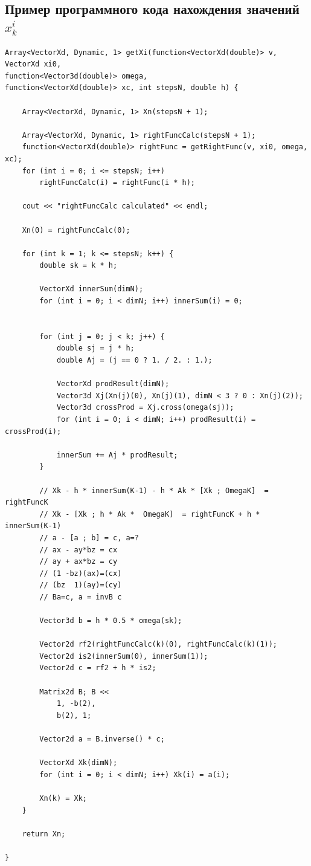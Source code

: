 \documentclass[12pt,a4paper]{article}
\begin{document}
\subsection{Пример программного кода нахождения значений $x_k^i$}
\label{code:xk}
\begin{lstlisting}
Array<VectorXd, Dynamic, 1> getXi(function<VectorXd(double)> v,
VectorXd xi0,
function<Vector3d(double)> omega,
function<VectorXd(double)> xc, int stepsN, double h) {

    Array<VectorXd, Dynamic, 1> Xn(stepsN + 1);

    Array<VectorXd, Dynamic, 1> rightFuncCalc(stepsN + 1);
    function<VectorXd(double)> rightFunc = getRightFunc(v, xi0, omega, xc);
    for (int i = 0; i <= stepsN; i++)
        rightFuncCalc(i) = rightFunc(i * h);

    cout << "rightFuncCalc calculated" << endl;

    Xn(0) = rightFuncCalc(0);

    for (int k = 1; k <= stepsN; k++) {
        double sk = k * h;

        VectorXd innerSum(dimN);
        for (int i = 0; i < dimN; i++) innerSum(i) = 0;


        for (int j = 0; j < k; j++) {
            double sj = j * h;
            double Aj = (j == 0 ? 1. / 2. : 1.);

            VectorXd prodResult(dimN);
            Vector3d Xj(Xn(j)(0), Xn(j)(1), dimN < 3 ? 0 : Xn(j)(2));
            Vector3d crossProd = Xj.cross(omega(sj));
            for (int i = 0; i < dimN; i++) prodResult(i) = crossProd(i);

            innerSum += Aj * prodResult;
        }

        // Xk - h * innerSum(K-1) - h * Ak * [Xk ; OmegaK]  = rightFuncK
        // Xk - [Xk ; h * Ak *  OmegaK]  = rightFuncK + h * innerSum(K-1)
        // a - [a ; b] = c, a=?
        // ax - ay*bz = cx
        // ay + ax*bz = cy
        // (1 -bz)(ax)=(cx)
        // (bz  1)(ay)=(cy)
        // Ba=c, a = invB c

        Vector3d b = h * 0.5 * omega(sk);

        Vector2d rf2(rightFuncCalc(k)(0), rightFuncCalc(k)(1));
        Vector2d is2(innerSum(0), innerSum(1));
        Vector2d c = rf2 + h * is2;

        Matrix2d B; B <<
            1, -b(2),
            b(2), 1;

        Vector2d a = B.inverse() * c;

        VectorXd Xk(dimN);
        for (int i = 0; i < dimN; i++) Xk(i) = a(i);

        Xn(k) = Xk;
    }

    return Xn;

}
\end{lstlisting}
\end{document}
